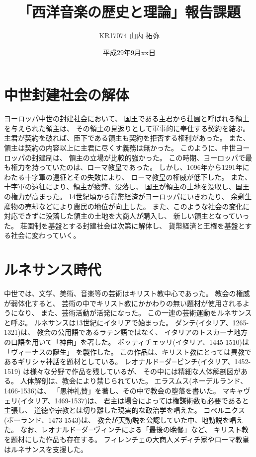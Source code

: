 \documentclass[a4j]{jarticle}
\title{「西洋音楽の歴史と理論」報告課題}
\author{KR17074 山内 拓弥}
\date{平成29年9月xx日}
\begin{document}


\section{中世封建社会の解体}

\large

ヨーロッパ中世の封建社会において、
国王である主君から荘園と呼ばれる領土を与えられた領主は、
その領土の見返りとして軍事的に奉仕する契約を結ぶ。
主君が契約を破れば、臣下である領主も契約を拒否する権利があった。
また、領主は契約の内容以上に主君に尽くす義務は無かった。
このように、中世ヨーロッパの封建制は、
領主の立場が比較的強かった。
この時期、ヨーロッパで最も権力を持っていたのは、ローマ教皇であった。
しかし、1096年から1291年にわたる十字軍の遠征とその失敗により、
ローマ教皇の権威が低下した。
また、十字軍の遠征により、領主が疲弊、没落し、
国王が領主の土地を没収し、国王の権力が高まった。
14世紀頃から貨幣経済がヨーロッパにいきわたり、
余剰生産物の売却などにより農民の地位が向上した。
また、このような社会の変化に対応できずに没落した領主の土地を大商人が購入し、
新しい領主となっていった。
荘園制を基盤とする封建社会は次第に解体し、
貨幣経済と王権を基盤とする社会に変わっていく。

\section{ルネサンス時代}

中世では、文学、美術、音楽等の芸術はキリスト教中心であった。
教会の権威が弱体化すると、
芸術の中でキリスト教にかかわりの無い題材が使用されるようになり、
また、芸術活動が活発になった。
この一連の芸術運動をルネサンスと呼ぶ。
ルネサンスは13世紀にイタリアで始まった。
ダンテ(イタリア、1265-1321)は、
教会の公用語であるラテン語ではなく、
イタリアのトスカーナ地方の口語を用いて「神曲」を著した。
ボッティチェッリ(イタリア、1445-1510)は「ヴィーナスの誕生」
を製作した。
この作品は、キリスト教にとっては異教であるギリシャ神話を題材としている。
レオナルド=ダ=ビンチ(イタリア、1452-1519)
は様々な分野で作品を残しているが、
その中には精細な人体解剖図がある。
人体解剖は、教会により禁じられていた。
エラスムス(ネーデルランド、1466-1536)は、
「愚神礼賛」を著し、その中で教会の堕落を書いた。
マキャヴェリ(イタリア、1469-1537)は、
君主は場合によっては権謀術数も必要であると主張し、
道徳や宗教とは切り離した現実的な政治学を唱えた。
コペルニクス(ポーランド、1473-1543)は、
教会が天動説を公認していた中、地動説を唱えた。
なお、レオナルド=ダ=ヴィンチによる「最後の晩餐」など、
キリスト教を題材にした作品も存在する。
フィレンチェの大商人メディチ家やローマ教皇はルネサンスを支援した。
\end{document}
